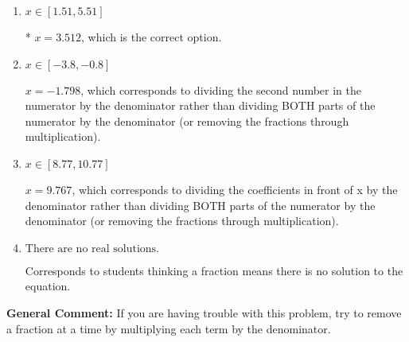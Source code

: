 \documentclass{extbook}[14pt]
\begin{document}
\begin{enumerate}
{\begin{enumerate}[label=\Alph*.]
 $x = -5.279$, which corresponds to not distributing the negative in front of the second fraction.
\item \( x \in [1.51, 5.51] \)

* $x = 3.512$, which is the correct option.
\item \( x \in [-3.8, -0.8] \)

 $x = -1.798$, which corresponds to dividing the second number in the numerator by the denominator rather than dividing BOTH parts of the numerator by the denominator (or removing the fractions through multiplication).
\item \( x \in [8.77, 10.77] \)

 $x = 9.767$, which corresponds to dividing the coefficients in front of x by the denominator rather than dividing BOTH parts of the numerator by the denominator (or removing the fractions through multiplication).
\item \( \text{There are no real solutions.} \)

Corresponds to students thinking a fraction means there is no solution to the equation.
\end{enumerate}

\textbf{General Comment:} If you are having trouble with this problem, try to remove a fraction at a time by multiplying each term by the denominator.
}
\end{enumerate}
\end{document}
